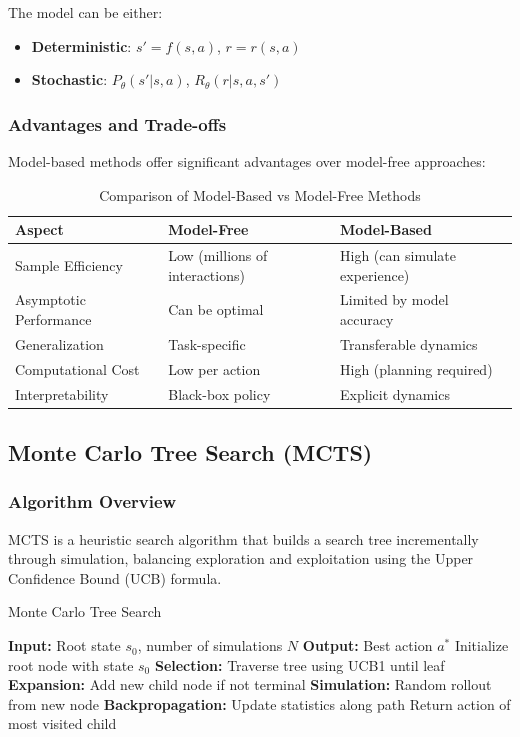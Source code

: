 \documentclass[12pt]{article}
\numberwithin{equation}{section}
\numberwithin{figure}{section}
\numberwithin{table}{section}
\numberwithin{algorithm}{section}
\begin{document}
{{{The model can be either:
\begin{itemize}
    \item \textbf{Deterministic}: $s' = f(s,a)$, $r = r(s,a)$
    \item \textbf{Stochastic}: $P_{\theta}(s'|s,a)$, $R_{\theta}(r|s,a,s')$
\end{itemize}

\subsubsection{Advantages and Trade-offs}
Model-based methods offer significant advantages over model-free approaches:

\begin{table}[H]
\centering
\caption{Comparison of Model-Based vs Model-Free Methods}
\begin{tabular}{|l|l|l|}
\hline
\textbf{Aspect} & \textbf{Model-Free} & \textbf{Model-Based} \\
\hline
Sample Efficiency & Low (millions of interactions) & High (can simulate experience) \\
Asymptotic Performance & Can be optimal & Limited by model accuracy \\
Generalization & Task-specific & Transferable dynamics \\
Computational Cost & Low per action & High (planning required) \\
Interpretability & Black-box policy & Explicit dynamics \\
\hline
\end{tabular}
\end{table}

\subsection{Monte Carlo Tree Search (MCTS)}

\subsubsection{Algorithm Overview}
MCTS is a heuristic search algorithm that builds a search tree incrementally through simulation, balancing exploration and exploitation using the Upper Confidence Bound (UCB) formula.

\begin{algorithm}[H]
\caption{Monte Carlo Tree Search}
\begin{algorithmic}[1]
\STATE \textbf{Input:} Root state $s_0$, number of simulations $N$
\STATE \textbf{Output:} Best action $a^*$
\STATE Initialize root node with state $s_0$
    \STATE \textbf{Selection:} Traverse tree using UCB1 until leaf
    \STATE \textbf{Expansion:} Add new child node if not terminal
    \STATE \textbf{Simulation:} Random rollout from new node
    \STATE \textbf{Backpropagation:} Update statistics along path
\ENDFOR
\STATE Return action of most visited child
\end{algorithmic}
\end{algorithm}

}}}
\end{document}
